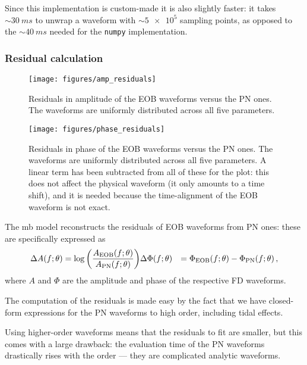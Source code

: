 \documentclass[main.tex]{subfiles}
\begin{document}
Since this implementation is custom-made it is also slightly faster: it takes \(\sim \SI{30}{ms}\) to unwrap a waveform with \(\sim \num{5e5}\) sampling points,  as opposed to the \(\sim \SI{40}{ms}\) needed for the \texttt{numpy} implementation. 

\subsubsection{Residual calculation} \label{sec:residuals}

\begin{figure}[ht]
\centering
\texttt{[image: figures/amp\_residuals]}
\caption{Residuals in amplitude of the EOB waveforms versus the \ac{PN} ones. The waveforms are uniformly distributed across all five parameters. }
\label{fig:amp_residuals}
\end{figure}

\begin{figure}[ht]
\centering
\texttt{[image: figures/phase\_residuals]}
\caption{Residuals in phase of the \ac{EOB} waveforms versus the \ac{PN} ones. The waveforms are uniformly distributed across all five parameters.
A linear term has been subtracted from all of these for the plot: this does not affect the physical waveform (it only amounts to a time shift), and it is needed because the time-alignment of the \ac{EOB} waveform is not exact.}
\label{fig:phase_residuals}
\end{figure}

The \ac{mb} model reconstructs the residuals of \ac{EOB} waveforms from \ac{PN} ones: these are specifically expressed as 
%
\begin{align} \label{eq:amplitude-phase-residuals}
\Delta A(f;\theta ) &= \log \qty(\frac{A _{\text{EOB}} (f;\theta )}{A _{\text{PN}} (f;\theta )})
\Delta \Phi (f; \theta ) &= \Phi _{\text{EOB}} (f; \theta ) - \Phi _{\text{PN}} (f; \theta )
\,,
\end{align}
%
where \(A\) and \(\Phi \) are the amplitude and phase of the respective \ac{FD} waveforms. 

The computation of the residuals is made easy by the fact that we have closed-form expressions for the \ac{PN} waveforms to high order, including tidal effects.

Using higher-order waveforms means that the residuals to fit are smaller, but this comes with a large drawback: the evaluation time of the \ac{PN} waveforms drastically rises with the order --- they are complicated analytic waveforms. 
\end{document}
